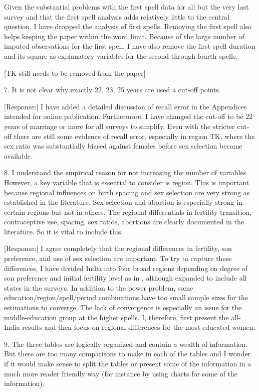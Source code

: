 \documentclass[letterpaper,12pt]{article}
\begin{document}
Given the substantial problems with the first spell data for all but the very last
survey and that the first spell analysis adds relatively little to the central question, 
I have dropped the analysis of first spells.
Removing the first spell also helps keeping the paper within the word limit.
Because of the large number of imputed observations for the first spell, I have also
remove the first spell duration and its square as explanatory variables for the second
through fourth spells.

[TK still needs to be removed from the paper]


7. It is not clear why exactly 22, 23, 25 years are used a cut-off
points.

[Response:]
I have added a detailed discussion of recall error in the Appendices intended for online 
publication.
Furthermore, I have changed the cut-off to be 22 years of marriage or more for all surveys 
to simplify.
Even with the stricter cut-off there are still some evidence of recall error,
especially in region TK, where the sex ratio was substantially biased against females 
before sex selection became available.


8. I understand the empirical reason for not increasing the number of
variables. However, a key variable that is essential to consider is
region. This is important because regional influences on birth spacing
and sex selection are very strong as established in the literature. Sex
selection and abortion is especially strong in certain regions but not
in others. The regional differentials in fertility transition,
contraceptive use, spacing, sex ratios, abortions are clearly documented
in the literature. So it is vital to include this.

[Response:]
I agree completely that the regional differences in fertility, son preference, and use 
of sex selection are important.
To try to capture these differences, I have divided India into four broad regions 
depending on degree of son preference and initial fertility level as in 
\citep{retherford03b}, although expanded to include all states in the surveys.
In addition to the power problem, some education/region/spell/period combinations have too 
small sample sizes for the estimations to converge.
The lack of convergence is especially an issue for the middle-education group at the
higher spells.
I, therefore, first present the all-India results and then focus on regional differences
for the most educated women.



9. The three tables are logically organized and contain a wealth of
information. But there are too many comparisons to make in each of the
tables and I wonder if it would make sense to split the tables or
present some of the information in a much more reader friendly way (for
instance by using charts for some of the information). 
\end{document}
